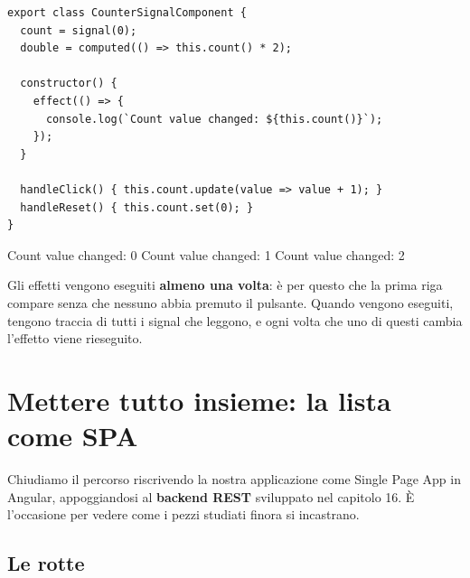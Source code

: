 \begin{affianco}[0.56][c]
\codicepiccolo
\begin{lstlisting}[style=ts, name=counter-signal.component.ts]
export class CounterSignalComponent {
  count = signal(0);
  double = computed(() => this.count() * 2);

  constructor() {
    effect(() => {
      console.log(`Count value changed: ${this.count()}`);
    });
  }

  handleClick() { this.count.update(value => value + 1); }
  handleReset() { this.count.set(0); }
}
\end{lstlisting}
\risultato
\begin{immagine}
\end{immagine}
\begin{console}
Count value changed: 0
Count value changed: 1
Count value changed: 2
\end{console}
\end{affianco}

Gli effetti vengono eseguiti \textbf{almeno una volta}: è per questo che la
prima riga compare senza che nessuno abbia premuto il pulsante. Quando vengono
eseguiti, tengono traccia di tutti i signal che leggono, e ogni volta che uno di
questi cambia l'effetto viene rieseguito.

\section{Mettere tutto insieme: la lista come SPA}

Chiudiamo il percorso riscrivendo la nostra applicazione come Single Page App in
Angular, appoggiandosi al \textbf{backend REST} sviluppato nel capitolo 16. È
l'occasione per vedere come i pezzi studiati finora si incastrano.

\subsection{Le rotte}

